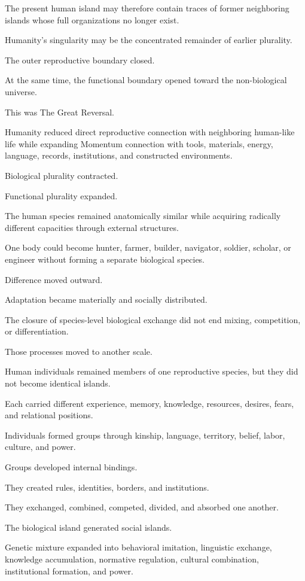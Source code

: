 The present human island may therefore contain traces of former neighboring islands whose full organizations no longer exist.

Humanity’s singularity may be the concentrated remainder of earlier plurality.

The outer reproductive boundary closed.

At the same time, the functional boundary opened toward the non-biological universe.

This was The Great Reversal.

Humanity reduced direct reproductive connection with neighboring human-like life while expanding Momentum connection with tools, materials, energy, language, records, institutions, and constructed environments.

Biological plurality contracted.

Functional plurality expanded.

The human species remained anatomically similar while acquiring radically different capacities through external structures.

One body could become hunter, farmer, builder, navigator, soldier, scholar, or engineer without forming a separate biological species.

Difference moved outward.

Adaptation became materially and socially distributed.

The closure of species-level biological exchange did not end mixing, competition, or differentiation.

Those processes moved to another scale.

Human individuals remained members of one reproductive species, but they did not become identical islands.

Each carried different experience, memory, knowledge, resources, desires, fears, and relational positions.

Individuals formed groups through kinship, language, territory, belief, labor, culture, and power.

Groups developed internal bindings.

They created rules, identities, borders, and institutions.

They exchanged, combined, competed, divided, and absorbed one another.

The biological island generated social islands.

Genetic mixture expanded into behavioral imitation, linguistic exchange, knowledge accumulation, normative regulation, cultural combination, institutional formation, and power.

